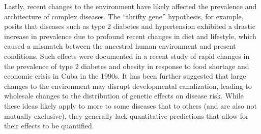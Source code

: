 \message{ !name(ResearchStrategy.tex)}\documentclass[11pt]{article}
\begin{document}
Lastly, recent changes to the environment have likely affected the prevalence and architecture of complex diseases. The “thrifty gene” hypothesis\cite{Neel:1962tj, Neel:1999tu}, for example, posits that diseases such as type 2 diabetes and hypertension exhibited a drastic increase in prevalence due to profound recent changes in diet and lifestyle, which caused a mismatch between the ancestral human environment and present conditions. Such effects were documented in a recent study of rapid changes in the prevalence of type 2 diabetes and obesity in response to food shortage and economic crisis in Cuba in the 1990s\cite{Franco:2013hb}. It has been further suggested that large changes to the environment may disrupt developmental canalization, leading to wholesale changes to the distribution of genetic effects on disease risk\cite{Gibson:2000vi, Gibson:2009ie}. While these ideas likely apply to more to some diseases that to others (and are also not mutually exclusive), they generally lack quantitative predictions that allow for their effects to be quantified.
\end{document}
